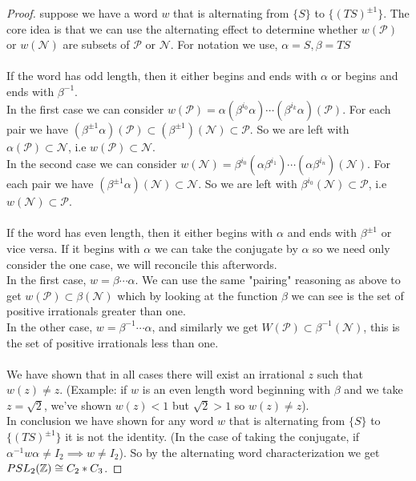 \begin{proof}
suppose we have a word $w$ that is alternating from $\{S\}$ to $\{{(TS)}^{\pm 1}\}$. The core idea is that we can use the alternating effect to determine whether $w(\mathcal{P})$ or $w(\mathcal{N})$ are subsets of $\mathcal{P}$ or $\mathcal{N}$. For notation we use, $\alpha = S, \beta = TS$\\
\\
If the word has odd length, then it either begins and ends with $\alpha$ or begins and ends with ${\beta}^{-1}$. \\
In the first case we can consider $w(\mathcal{P}) = \alpha ({\beta}^{i_0}\alpha)\cdots ({\beta}^{i_k} \alpha) ( \mathcal{P})$. For each pair we have $({\beta}^{\pm 1} \alpha) (\mathcal{P}) \subset ({\beta}^{\pm 1})(\mathcal{N}) \subset \mathcal{P}$. So we are left with $\alpha(\mathcal{P}) \subset \mathcal{N}$, i.e $w(\mathcal{P}) \subset \mathcal{N}$.\\
In the second case we can consider $w(\mathcal{N}) = {\beta}^{i_0}(\alpha{\beta}^{i_1}) \cdots (\alpha{\beta}^{i_n})(\mathcal{N})$. For each pair we have $({\beta}^{\pm 1}\alpha)(\mathcal{N}) \subset \mathcal{N}$. So we are left with ${\beta}^{i_0}(\mathcal{N}) \subset \mathcal{P}$, i.e $w(\mathcal{N}) \subset \mathcal{P}$.\\
\\
If the word has even length, then it either begins with $\alpha$ and ends with ${\beta}^{\pm 1}$ or vice versa. If it begins with $\alpha$ we can take the conjugate by $\alpha$ so we need only consider the one case, we will reconcile this afterwords. \\
In the first case, $w = \beta \cdots \alpha $. We can use the same "pairing" reasoning as above to get $w(\mathcal{P}) \subset \beta (\mathcal{N})$ which by looking at the function $\beta$ we can see is the set of positive irrationals greater than one.\\
In the other case, $w = {\beta}^{-1} \cdots \alpha$, and similarly we get $W(\mathcal{P}) \subset {\beta}^{-1}(\mathcal{N})$, this is the set of positive irrationals less than one.\\
\\
We have shown that in all cases there will exist an irrational $z$ such that $w(z) \neq z$. (Example: if $w$ is an even length word beginning with $\beta$ and we take $z =\sqrt{2}$, we've shown $w(z) < 1$ but $\sqrt{2} >1$ so $w(z) \neq z$). \\
In conclusion we have shown for any word $w$ that is alternating from $\{S\}$ to $\{{(TS)}^{\pm 1}\}$ it is not the identity. (In the case of taking the conjugate, if ${\alpha}^{-1}w\alpha \neq I_2 \implies w \neq I_2$). So by the alternating word characterization we get $PSL_2(\mathbb{Z}) \cong C_2 * C_3$.
\end{proof}

